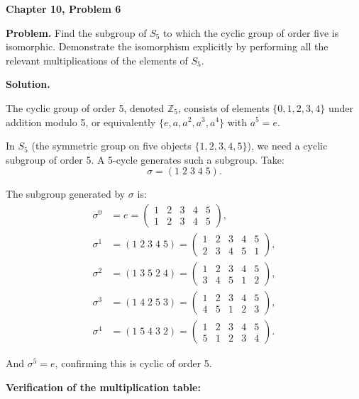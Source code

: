 \documentclass[12pt]{article}
\begin{document}
\begin{center}
{\Large\bfseries Chapter 10, Problem 6}
\end{center}

\noindent\textbf{Problem.} Find the subgroup of $S_5$ to which the cyclic group of order five is isomorphic. Demonstrate the isomorphism explicitly by performing all the relevant multiplications of the elements of $S_5$.

\bigskip
\noindent\textbf{Solution.}

The cyclic group of order 5, denoted $\mathbb{Z}_5$, consists of elements $\{0, 1, 2, 3, 4\}$ under addition modulo 5, or equivalently $\{e, a, a^2, a^3, a^4\}$ with $a^5 = e$.

In $S_5$ (the symmetric group on five objects $\{1,2,3,4,5\}$), we need a cyclic subgroup of order 5. A 5-cycle generates such a subgroup. Take:
\[
\sigma = (1\;2\;3\;4\;5).
\]

The subgroup generated by $\sigma$ is:
\begin{align*}
\sigma^0 &= e = \begin{pmatrix} 1 & 2 & 3 & 4 & 5 \\ 1 & 2 & 3 & 4 & 5 \end{pmatrix}, \\[6pt]
\sigma^1 &= (1\;2\;3\;4\;5) = \begin{pmatrix} 1 & 2 & 3 & 4 & 5 \\ 2 & 3 & 4 & 5 & 1 \end{pmatrix}, \\[6pt]
\sigma^2 &= (1\;3\;5\;2\;4) = \begin{pmatrix} 1 & 2 & 3 & 4 & 5 \\ 3 & 4 & 5 & 1 & 2 \end{pmatrix}, \\[6pt]
\sigma^3 &= (1\;4\;2\;5\;3) = \begin{pmatrix} 1 & 2 & 3 & 4 & 5 \\ 4 & 5 & 1 & 2 & 3 \end{pmatrix}, \\[6pt]
\sigma^4 &= (1\;5\;4\;3\;2) = \begin{pmatrix} 1 & 2 & 3 & 4 & 5 \\ 5 & 1 & 2 & 3 & 4 \end{pmatrix}.
\end{align*}

And $\sigma^5 = e$, confirming this is cyclic of order 5.

\medskip
\noindent\textbf{Verification of the multiplication table:}
\end{document}
